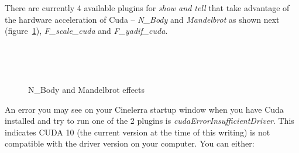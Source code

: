 There are currently 4 available plugins for \textit{show and tell} that take advantage of the hardware acceleration of Cuda -- \textit{N\_Body} and \textit{Mandelbrot} as shown next (figure~\ref{fig:cuda-effects}), \textit{F\_scale\_cuda} and \textit{F\_yadif\_cuda}.

\begin{figure}[htpb]
	\centering
	\begin{minipage}[h]{0.99\linewidth}
		 \\
	\end{minipage}
	\vfill
	\begin{minipage}[h]{0.7\linewidth}
		 \\
	\end{minipage}
	\caption{N\_Body and Mandelbrot effects}
	\label{fig:cuda-effects}
\end{figure}

An error you may see on your Cinelerra startup window when you have Cuda installed and try to run one of the 2 plugins is \textit{cudaErrorInsufficientDriver}.  This indicates CUDA 10 (the current version at the time of this writing) is not compatible with the driver version on your computer.  You can either:

